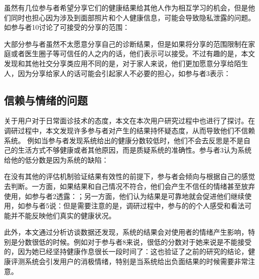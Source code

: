 虽然有几位参与者希望分享它们的健康结果给其他人作为相互学习的机会，但是他们同时也担心因为涉及到面部照片和个人健康信息，可能会导致隐私泄露的问题。
如参与者10讨论了可接受的分享的范围：

大部分参与者虽然不太愿意分享自己的诊断结果，但是如果将分享的范围限制在家庭或者医生圈子等可信任的人之内的话，他们表示可以接受。不过有趣的是，本文发现和其他社交分享类应用不同的是，对于家人来说，他们更加愿意分享给陌生人，因为分享给家人的话可能会引起家人不必要的担心，如参与者3表示：


\subsection{信赖与情绪的问题}
关于用户对于日常面诊技术的态度，本文在本次用户研究过程中也进行了探讨。在调研过程中，本文发现许多参与者对产生的结果持怀疑态度，从而导致他们不信赖系统。
例如当参与者发现系统给出的健康分数较低时，他们不会去反思是不是自己的生活方式不够健康或者其他原因，而是质疑系统的准确性。参与者3认为系统给他的低分数是因为系统的缺陷：

在没有其他的评估机制验证结果有效性的前提下，参与者会倾向与根据自己的感觉去判断。一方面，如果结果和自己情况不符合，他们会产生不信任的情绪甚至放弃使用，如参与者2透露：；另一方面，他们认为结果是可靠地就会促进他们继续使用，如参与者5说：但是需要注意的是，调研过程中，参与的的个人感受和看法可能并不能反映他们真实的健康状况。

此外，本文通过分析访谈数据还发现，系统的结果会对使用者的情绪产生影响，特别是分数很低的时候。例如对于参与者8来说，很低的分数对于她来说是不能接受的，因为她已经坚持健康作息很长一段时间了：这也验证了之前的研究\cite{Toscos2013Designing}的结论，健康评测系统会引发用户的消极情绪，特别是当系统给出负面结果的时候需要非常注意。

